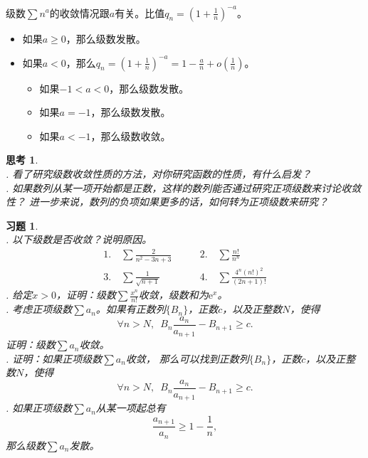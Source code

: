 \documentclass[12pt,UTF8]{ctexbook}
\newcommand{\olim}[1]{\mathit{o}\left(#1\right)}  %
\theoremstyle{definition}
\theoremstyle{plain}
\newtheorem{sk}{思考}[section]
\newtheorem{xt}{习题}[section]
\begin{document}
级数$\sum n^a$的收敛情况跟$a$有关。比值$q_n = \left(1 + \frac{1}{n}\right)^{-a}$。
\begin{itemize}
    \item 如果$a\geqslant 0$，那么级数发散。
    \item 如果$a<0$，那么$q_n = \left(1 + \frac{1}{n}\right)^{-a} = 1 - \frac{a}{n} + \olim{\frac{1}{n}}$。
    \begin{itemize}
        \item 如果$-1 < a < 0$，那么级数发散。
        \item 如果$a = -1$，那么级数发散。
        \item 如果$a < -1$，那么级数收敛。
    \end{itemize}
\end{itemize}

\begin{sk}
    \mbox{} \\
    . 看了研究级数收敛性质的方法，对你研究函数的性质，有什么启发？\\
    . 如果数列从某一项开始都是正数，这样的数列能否通过研究正项级数来讨论收敛性？
    进一步来说，数列的负项如果更多的话，如何转为正项级数来研究？
\end{sk}

\begin{xt}
    \mbox{} \\
    . 以下级数是否收敛？说明原因。
    $$
    \begin{array}{ll}
        1. \quad \sum \frac{2}{n^2 - 3n + 3} \qquad &2. \quad \sum \frac{n!}{n^n} \\
        3. \quad \sum \frac{1}{\sqrt{n + 1}} \qquad &4. \quad \sum \frac{4^n (n!)^2}{(2n + 1)!} 
    \end{array}
    $$
    . 给定$x>0$，证明：级数$\sum \frac{x^n}{n!}$收敛，级数和为$\mathrm{e}^x$。\\
    . 考虑正项级数$\sum a_n$。如果有正数列$\{B_n\}$，正数$c$，以及正整数$N$，使得
    $$ \forall n > N, \,\,\, B_n \frac{a_n}{a_{n+1}} - B_{n+1} \geqslant c. $$
    证明：级数$\sum a_n$收敛。\\
    . 证明：如果正项级数$\sum a_n$收敛，
    那么可以找到正数列$\{B_n\}$，正数$c$，以及正整数$N$，使得
    $$ \forall n > N, \,\,\, B_n \frac{a_n}{a_{n+1}} - B_{n+1} \geqslant c. $$
    . 如果正项级数$\sum a_n$从某一项起总有
    $$ \frac{a_{n+1}}{a_n} \geqslant 1 - \frac{1}{n},$$
    那么级数$\sum a_n$发散。\\

\end{xt}
\end{document}
